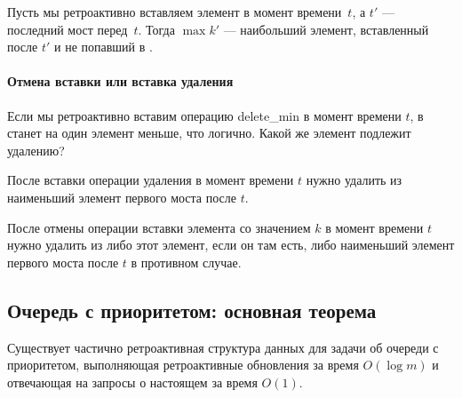 \begin{stat}
	Пусть мы ретроактивно вставляем элемент в момент времени~$t$, а $t'$ — последний мост перед~$t$. Тогда $\max k'$ — наибольший элемент, вставленный после $t'$ и не попавший в \qnow.
\end{stat} \vspace{-4mm}

\paragraph{Отмена вставки или вставка удаления} Если мы ретроактивно вставим операцию delete\_min в момент времени $t$, в \qnow станет на один элемент меньше, что логично. Какой же элемент подлежит удалению?

\begin{stat}
	После вставки операции удаления в момент времени $t$ нужно удалить из \qnow наименьший элемент первого моста после $t$.

	После отмены операции вставки элемента со значением $k$ в момент времени $t$ нужно удалить из \qnow либо этот элемент, если он там есть, либо наименьший элемент первого моста после $t$ в противном случае.
\end{stat}

\subsection{Очередь с приоритетом: основная теорема}

\begin{theorem} 
	Существует частично ретроактивная структура данных для задачи об очереди с приоритетом, выполняющая ретроактивные обновления за время $O(\log m)$ и отвечающая на запросы о настоящем за время $O(1)$.
\end{theorem}

